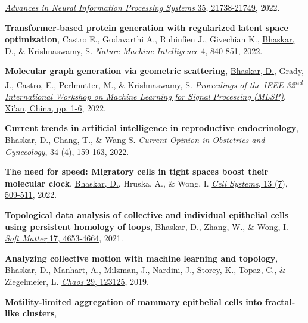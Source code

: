 \documentclass[margin,line]{res}
\begin{document}
\begin{resume}
{\begin{etaremune}[start=16]
\href{https://proceedings.neurips.cc/paper_files/paper/2022/hash/88438dc62fc5c8777e2b5f1b4f6d37a2-Abstract-Conference.html}{\textit{Advances in Neural Information Processing Systems} 35, 21738-21749}, 2022.
\vspace*{.1cm}
\item{\bf Transformer-based protein generation with regularized latent space optimization}, 
Castro E., Godavarthi A., Rubinfien J., Givechian K., \underline{Bhaskar, D.}, \& Krishnaswamy, S.
\href{https://www.nature.com/articles/s42256-022-00532-1}{\textit{Nature Machine Intelligence} 4, 840-851}, 2022.
\vspace*{.1cm}
\item{\bf Molecular graph generation via geometric scattering},
\underline{Bhaskar, D.}, Grady, J., Castro, E., Perlmutter, M., \& Krishnaswamy, S.
\href{https://doi.org/10.1109/MLSP55214.2022.9943379}{\textit{Proceedings of the IEEE 32\textsuperscript{nd} International Workshop on Machine Learning for Signal Processing (MLSP)}, Xi'an, China, pp. 1-6}, 2022.
\vspace*{.1cm}
\item{\bf Current trends in artificial intelligence in reproductive endocrinology},
\underline{Bhaskar, D.}, Chang, T., \& Wang S.
\href{https://doi.org/10.1097/GCO.0000000000000796}{\textit{Current Opinion in Obstetrics and Gynecology}, 34 (4), 159-163}, 2022.
\vspace*{.1cm}
\item{\bf The need for speed: Migratory cells in tight spaces boost their molecular clock},
\underline{Bhaskar, D.}, Hruska, A., \& Wong, I.
\href{https://doi.org/10.1016/j.cels.2022.06.002}{\textit{Cell Systems}, 13 (7), 509-511}, 2022.
\vspace*{.1cm}
\item{\bf Topological data analysis of collective and individual epithelial cells using persistent homology of loops}, 
\underline{Bhaskar, D.}, Zhang, W., \& Wong, I. 
\href{https://doi.org/10.1039/D1SM00072A}{\textit{Soft Matter} 17, 4653-4664}, 2021.
\vspace*{.1cm}
\item{\bf Analyzing collective motion with machine learning and topology}, 
\underline{Bhaskar, D.}, Manhart, A., Milzman, J., Nardini, J., Storey, K., Topaz, C., \& Ziegelmeier, L. 
\href{https://aip.scitation.org/doi/10.1063/1.5125493}{\textit{Chaos} 29, 123125}, 2019.
\vspace*{.1cm}
\item{\bf Motility-limited aggregation of mammary epithelial cells into fractal-like clusters}, 

\end{etaremune}}
\end{resume}
\end{document}
